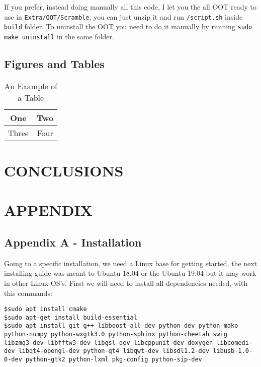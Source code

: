 \documentclass[a4paper, 10pt, conference]{ieeeconf}      %
\begin{document}
If you prefer, instead doing manually all this code, I let you the all OOT ready to use in \verb|Extra/OOT/Scramble|, you can just unzip it and run \verb|/script.sh| inside \verb|build| folder. To uninstall the OOT you need to do it manually by running \verb|sudo make uninstall| in the same folder.

\subsection{Figures and Tables}

\begin{table}[h]
\caption{An Example of a Table}
\label{table_example}
\begin{center}
\begin{tabular}{|c||c|}
\hline
One & Two\\
\hline
Three & Four\\
\hline
\end{tabular}
\end{center}
\end{table}

\section{CONCLUSIONS}




\section*{APPENDIX}
\subsection{Appendix A - Installation}
Going to a specific installation, we need a Linux base for getting started, the next installing guide was meant to Ubuntu 18.04 or the Ubuntu 19.04 but it may work in other Linux OS's. First we will need to install all dependencies needed, with this commands:

\begin{lstlisting}[breaklines]
$sudo apt install cmake
$sudo apt-get install build-essential
$sudo apt install git g++ libboost-all-dev python-dev python-mako python-numpy python-wxgtk3.0 python-sphinx python-cheetah swig libzmq3-dev libfftw3-dev libgsl-dev libcppunit-dev doxygen libcomedi-dev libqt4-opengl-dev python-qt4 libqwt-dev libsdl1.2-dev libusb-1.0-0-dev python-gtk2 python-lxml pkg-config python-sip-dev
\end{lstlisting}
\end{document}
